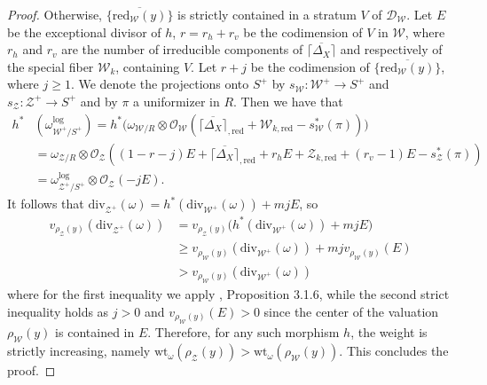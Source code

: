 \documentclass{amsart}%
\numberwithin{equation}{subsection}
\theoremstyle{plain2}
\theoremstyle{definition2}
\theoremstyle{stepstyle}
\theoremstyle{point}
\theoremstyle{subpoint}
\newcommand{\D}{{\mathcal D}}
\newcommand{\caO}{\ensuremath{\mathcal{O}}}
\newcommand{\cZ}{\ensuremath{\mathscr{Z}}}
\newcommand{\cW}{\ensuremath{\mathscr{W}}}
\newcommand{\redu}{\mathrm{red}}
\newcommand{\divisor}{\mathrm{div}}
\newcommand{\weight}{\mathrm{wt}}
\begin{document}
\begin{proof}
Otherwise, $\overline{ \{\redu_{\cW}(y)\}}$ is strictly contained in a stratum $V$ of $\D_\cW$. Let $E$ be the exceptional divisor of $h$, $r=r_h +r_v$ be the codimension of $V$ in $\cW$, where $r_h$ and $r_v$ are the number of irreducible components of $\overline{\lceil\Delta_X \rceil}$ and respectively of the special fiber $\cW_k$, containing $V$. Let $r+j$ be the codimension of $\overline{ \{\redu_{\cW}(y)\}}$, where $j \geqslant 1$. We denote the projections onto $S^+$ by $s_{\cW}:\cW^+\rightarrow S^+$ and $s_{\cZ}:\cZ^+ \rightarrow S^+$ and by $\pi$ a uniformizer in $R$. Then we have that
\begin{align*}
h^*&(\omega^{\log}_{\cW^+/S^+}) = h^* \big(\omega_{\cW/R} \otimes \caO_{\cW}(\overline{\lceil\Delta_X \rceil}_{,\redu} + \cW_{k,\redu} - s_\cW^*(\pi)) \big) \\
& = \omega_{\cZ/R}\otimes \caO_{\cZ}((1-r-j)E +\overline{\lceil\Delta_X \rceil}_{,\redu} + r_hE+ \cZ_{k,\redu} + (r_v-1)E - s_\cZ^*(\pi))\\
& = \omega^{\log}_{\cZ^+/S^+} \otimes \caO_{\cZ}(-j E).
\end{align*} It follows that $\divisor_{\cZ^+}(\omega)= h^*(\divisor_{\cW^+}(\omega)) + mjE$, so
\begin{align*}
v_{\rho_\cZ(y)}(\divisor_{\cZ^+}(\omega))& = v_{\rho_\cZ(y)}\big(h^*(\divisor_{\cW^+}(\omega)) + mjE\big)  \\ & \geqslant v_{\rho_\cW(y)}(\divisor_{\cW^+}(\omega)) + mj v_{\rho_\cW(y)}(E) \\ & > v_{\rho_\cW(y)}(\divisor_{\cW^+}(\omega))
\end{align*} where for the first inequality we apply \cite{MustataNicaise}, Proposition 3.1.6, while the second strict inequality holds as $j >0$ and  $v_{\rho_\cW(y)}(E) >0 $ since the center of the valuation $\rho_\cW(y)$ is contained in $E$. Therefore, for any such morphism $h$, the weight is strictly increasing, namely $\weight_{\omega}(\rho_\cZ(y)) > \weight_{\omega} (\rho_\cW(y))$. This concludes the proof.
\end{proof}
\end{document}
